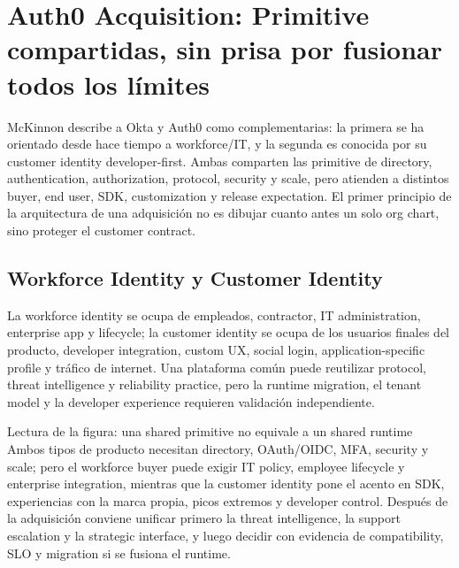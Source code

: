 \section{Auth0 Acquisition: Primitive compartidas, sin prisa por fusionar todos los límites}

McKinnon describe a Okta y Auth0 como complementarias: la primera se ha orientado desde hace tiempo a workforce/IT, y la segunda es conocida por su customer identity developer-first. Ambas comparten las primitive de directory, authentication, authorization, protocol, security y scale, pero atienden a distintos buyer, end user, SDK, customization y release expectation. El primer principio de la arquitectura de una adquisición no es dibujar cuanto antes un solo org chart, sino proteger el customer contract.

\subsection{Workforce Identity y Customer Identity}

La workforce identity se ocupa de empleados, contractor, IT administration, enterprise app y lifecycle; la customer identity se ocupa de los usuarios finales del producto, developer integration, custom UX, social login, application-specific profile y tráfico de internet. Una plataforma común puede reutilizar protocol, threat intelligence y reliability practice, pero la runtime migration, el tenant model y la developer experience requieren validación independiente.


\begin{knowledgebox}{Lectura de la figura: una shared primitive no equivale a un shared runtime}
Ambos tipos de producto necesitan directory, OAuth/OIDC, MFA, security y scale; pero el workforce buyer puede exigir IT policy, employee lifecycle y enterprise integration, mientras que la customer identity pone el acento en SDK, experiencias con la marca propia, picos extremos y developer control. Después de la adquisición conviene unificar primero la threat intelligence, la support escalation y la strategic interface, y luego decidir con evidencia de compatibility, SLO y migration si se fusiona el runtime.
\end{knowledgebox}


